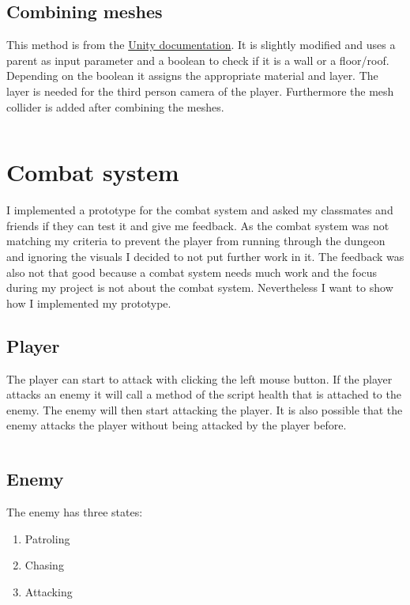 \documentclass[a4paper,11pt,oneside]{scrreprt}
\begin{document}
\subsection{Combining meshes}
This method is from the \href{https://docs.unity3d.com/ScriptReference/Mesh.CombineMeshes.html}{Unity documentation}. It is slightly modified and uses a parent as input parameter and a boolean to check if it is a wall or a floor/roof. 
\\
Depending on the boolean it assigns the appropriate material and layer. The layer is needed for the third person camera of the player. Furthermore the mesh collider is added after combining the meshes.
\inputminted[fontsize=\footnotesize,linenos]{csharp}{code/CombineMeshes.cs}


\section{Combat system}
I implemented a prototype for the combat system and asked my classmates and friends if they can test it and give me feedback. As the combat system was not matching my criteria to prevent the player from running through the dungeon and ignoring the visuals I decided to not put further work in it. The feedback was also not that good because a combat system needs much work and the focus during my project is not about the combat system. Nevertheless I want to show how I implemented my prototype.
\subsection{Player}
The player can start to attack with clicking the left mouse button. If the player attacks an enemy it will call a method of the script health that is attached to the enemy. The enemy will then start attacking the player. It is also possible that the enemy attacks the player without being attacked by the player before. 
\inputminted[fontsize=\footnotesize,linenos]{csharp}{code/Player.cs}

\subsection{Enemy}
The enemy has three states:
\begin{enumerate}
\item Patroling
\item Chasing
\item Attacking
\end{enumerate}
\end{document}
